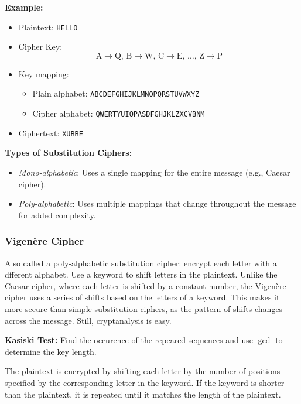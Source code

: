 \textbf{Example:}
\begin{itemize}
    \item Plaintext: \texttt{HELLO}
    
    \item Cipher Key:
    \[
    \text{A} \rightarrow \text{Q}, \, \text{B} \rightarrow \text{W}, \, \text{C} \rightarrow \text{E}, \, \ldots, \, \text{Z} \rightarrow \text{P}
    \]

    \item Key mapping:
        \begin{itemize}
            \item Plain alphabet: \texttt{ABCDEFGHIJKLMNOPQRSTUVWXYZ}
            \item Cipher alphabet: \texttt{QWERTYUIOPASDFGHJKLZXCVBNM}
        \end{itemize}
    
    \item Ciphertext: \texttt{XUBBE}
\end{itemize}


\textbf{Types of Substitution Ciphers}:
    \begin{itemize}
        \item \emph{Mono-alphabetic}: Uses a single mapping for the entire message (e.g., Caesar cipher).
        \item \emph{Poly-alphabetic}: Uses multiple mappings that change throughout the message for added complexity.
    \end{itemize}

\subsubsection{Vigenère Cipher}
Also called a poly-alphabetic substitution cipher: encrypt each letter with a dfferent alphabet. Use a keyword to shift letters in the plaintext. Unlike the Caesar cipher, where each letter is shifted by a constant number, the Vigenère cipher uses a series of shifts based on the letters of a keyword. This makes it more secure than simple substitution ciphers, as the pattern of shifts changes across the message.  Still, cryptanalysis is easy.

\begin{defn}
    \textbf{Kasiski Test:} Find the occurence of the repeared sequences and use $\gcd$ to determine the key length.
\end{defn}

The plaintext is encrypted by shifting each letter by the number of positions specified by the corresponding letter in the keyword. If the keyword is shorter than the plaintext, it is repeated until it matches the length of the plaintext.\\

